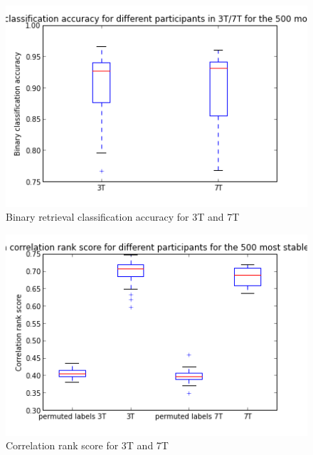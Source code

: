  
 
\begin{figure}
	\centering
	\includegraphics[width=\linewidth]{pics/binary_retrieval_accuracy}
	\caption{Binary retrieval classification accuracy for 3T and 7T}
	\label{fig:binretr}
\end{figure}
 
 
 
 
\begin{figure}
	\centering
	\includegraphics[width=\linewidth]{pics/correlation_rank_score}
	\caption{Correlation rank score for 3T and 7T}
	\label{fig:rankscore}
\end{figure}
 
